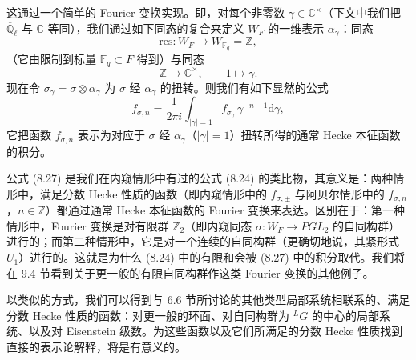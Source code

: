 \documentclass[11pt,a4paper]{article}
\begin{document}
这通过一个简单的 Fourier 变换实现。即，对每个非零数 $\gamma\in\mathbb{C}^\times$（下文中我们把 $\overline{\mathbb{Q}}_\ell$ 与 $\mathbb{C}$ 等同），我们通过如下同态的复合来定义 $W_F$ 的一维表示 $\alpha_\gamma$：同态
\begin{equation}\tag{8.26}
\mathrm{res} : W_F \to W_{\mathbb{F}_q} = \mathbb{Z},
\end{equation}
（它由限制到标量 $\mathbb{F}_q\subset F$ 得到）与同态
\[
\mathbb{Z}\to \mathbb{C}^\times, \qquad 1\mapsto \gamma.
\]
现在令 $\sigma_\gamma = \sigma\otimes\alpha_\gamma$ 为 $\sigma$ 经 $\alpha_\gamma$ 的扭转。则我们有如下显然的公式
\begin{equation}\tag{8.27}
f_{\sigma,n} = \frac{1}{2\pi i}\int_{|\gamma|=1} f_{\sigma_\gamma}\,\gamma^{-n-1}\mathrm{d}\gamma,
\end{equation}
它把函数 $f_{\sigma,n}$ 表示为对应于 $\sigma$ 经 $\alpha_\gamma$（$|\gamma|=1$）扭转所得的通常 Hecke 本征函数的积分。

公式 (8.27) 是我们在内窥情形中有过的公式 (8.24) 的类比物，其意义是：两种情形中，满足分数 Hecke 性质的函数（即内窥情形中的 $f_{\sigma,\pm}$ 与阿贝尔情形中的 $f_{\sigma,n}$，$n\in\mathbb{Z}$）都通过通常 Hecke 本征函数的 Fourier 变换来表达。区别在于：第一种
情形中，Fourier 变换是对有限群 $\mathbb{Z}_2$（即内窥同态 $\sigma : W_F \to PGL_2$ 的自同构群）进行的；而第二种情形中，它是对一个连续的自同构群（更确切地说，其紧形式 $U_1$）进行的。这就是为什么 (8.24) 中的有限和会被 (8.27) 中的积分取代。我们将在 9.4 节看到关于更一般的有限自同构群作这类 Fourier 变换的其他例子。


以类似的方式，我们可以得到与 6.6 节所讨论的其他类型局部系统相联系的、满足分数 Hecke 性质的函数：对更一般的环面、对自同构群为 ${}^{L}G$ 的中心的局部系统、以及对 Eisenstein 级数。为这些函数以及它们所满足的分数 Hecke 性质找到直接的表示论解释，将是有意义的。
\end{document}
